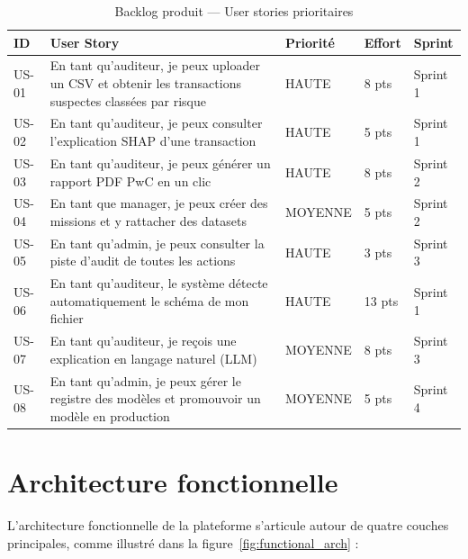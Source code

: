\documentclass[12pt,a4paper,twoside]{report}
\theoremstyle{definition}
\begin{document}
\begin{table}[H]
\centering
\caption{Backlog produit — User stories prioritaires}
\label{tab:backlog}
\renewcommand{\arraystretch}{1.3}
\begin{tabularx}{\textwidth}{C{0.8cm}L{5.5cm}C{1.5cm}C{1.5cm}C{2cm}}
\toprule
\textbf{ID} & \textbf{User Story} & \textbf{Priorité} & \textbf{Effort} & \textbf{Sprint} \\
\midrule
US-01 & En tant qu'auditeur, je peux uploader un CSV et obtenir les transactions suspectes classées par risque & HAUTE & 8 pts & Sprint 1 \\
US-02 & En tant qu'auditeur, je peux consulter l'explication SHAP d'une transaction & HAUTE & 5 pts & Sprint 1 \\
US-03 & En tant qu'auditeur, je peux générer un rapport PDF PwC en un clic & HAUTE & 8 pts & Sprint 2 \\
US-04 & En tant que manager, je peux créer des missions et y rattacher des datasets & MOYENNE & 5 pts & Sprint 2 \\
US-05 & En tant qu'admin, je peux consulter la piste d'audit de toutes les actions & HAUTE & 3 pts & Sprint 3 \\
US-06 & En tant qu'auditeur, le système détecte automatiquement le schéma de mon fichier & HAUTE & 13 pts & Sprint 1 \\
US-07 & En tant qu'auditeur, je reçois une explication en langage naturel (LLM) & MOYENNE & 8 pts & Sprint 3 \\
US-08 & En tant qu'admin, je peux gérer le registre des modèles et promouvoir un modèle en production & MOYENNE & 5 pts & Sprint 4 \\
\bottomrule
\end{tabularx}
\end{table}

\section{Architecture fonctionnelle}

L'architecture fonctionnelle de la plateforme s'articule autour de quatre couches
principales, comme illustré dans la figure~\ref{fig:functional_arch} :
\end{document}
